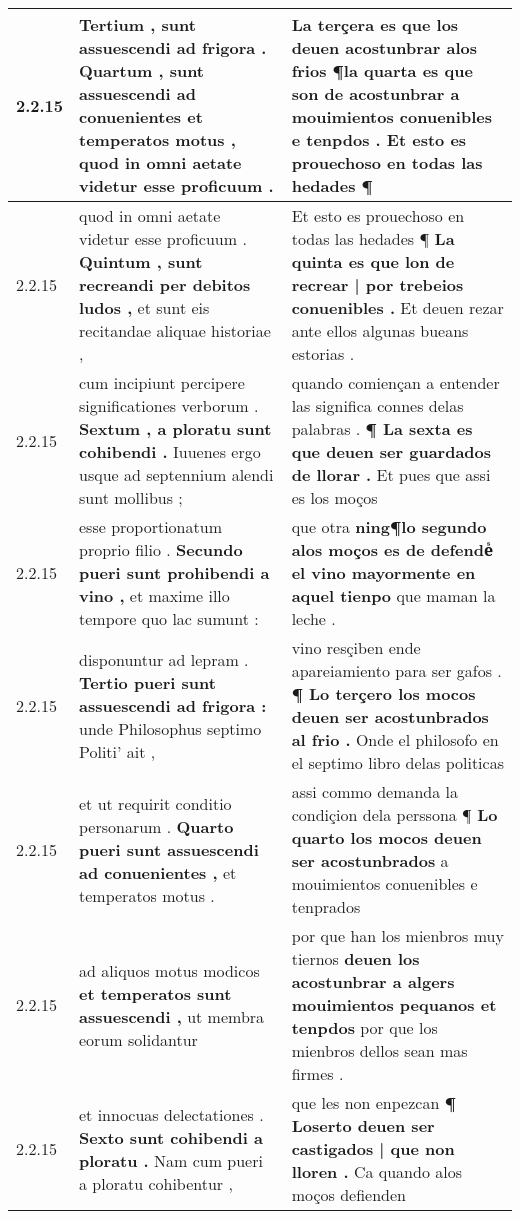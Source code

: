 \begin{tabular}{|p{1cm}|p{6.5cm}|p{6.5cm}|}
2.2.15 & Tertium , sunt assuescendi ad frigora . \textbf{ Quartum , sunt assuescendi ad conuenientes et temperatos motus , } quod in omni aetate videtur esse proficuum . & La terçera es que los deuen acostunbrar alos frios \textbf{ ¶la quarta es que son de acostunbrar a mouimientos conuenibles e tenpdos . } Et esto es prouechoso en todas las hedades ¶ \\\hline
2.2.15 & quod in omni aetate videtur esse proficuum . \textbf{ Quintum , sunt recreandi per debitos ludos , } et sunt eis recitandae aliquae historiae , & Et esto es prouechoso en todas las hedades ¶ \textbf{ La quinta es que lon de recrear | por trebeios conuenibles . } Et deuen rezar ante ellos algunas bueans estorias . \\\hline
2.2.15 & cum incipiunt percipere significationes verborum . \textbf{ Sextum , a ploratu sunt cohibendi . } Iuuenes ergo usque ad septennium alendi sunt mollibus ; & quando comiençan a entender las significa connes delas palabras . \textbf{ ¶ La sexta es que deuen ser guardados de llorar . } Et pues que assi es los moços \\\hline
2.2.15 & esse proportionatum proprio filio . \textbf{ Secundo pueri sunt prohibendi a vino , } et maxime illo tempore quo lac sumunt : & que otra \textbf{ ning¶lo segundo alos moços es de defendeᷤ el vino mayormente en aquel tienpo } que maman la leche . \\\hline
2.2.15 & disponuntur ad lepram . \textbf{ Tertio pueri sunt assuescendi ad frigora : } unde Philosophus septimo Politi’ ait , & vino resçiben ende apareiamiento para ser gafos . \textbf{ ¶ Lo terçero los mocos deuen ser acostunbrados al frio . } Onde el philosofo en el septimo libro delas politicas \\\hline
2.2.15 & et ut requirit conditio personarum . \textbf{ Quarto pueri sunt assuescendi ad conuenientes , } et temperatos motus . & assi commo demanda la condiçion dela perssona ¶ \textbf{ Lo quarto los mocos deuen ser acostunbrados } a mouimientos conuenibles e tenprados \\\hline
2.2.15 & ad aliquos motus modicos \textbf{ et temperatos sunt assuescendi , } ut membra eorum solidantur & por que han los mienbros muy tiernos \textbf{ deuen los acostunbrar a algers mouimientos pequanos et tenpdos } por que los mienbros dellos sean mas firmes . \\\hline
2.2.15 & et innocuas delectationes . \textbf{ Sexto sunt cohibendi a ploratu . } Nam cum pueri a ploratu cohibentur , & que les non enpezcan \textbf{ ¶ Loserto deuen ser castigados | que non lloren . } Ca quando alos moços defienden \\\hline

\end{tabular}
